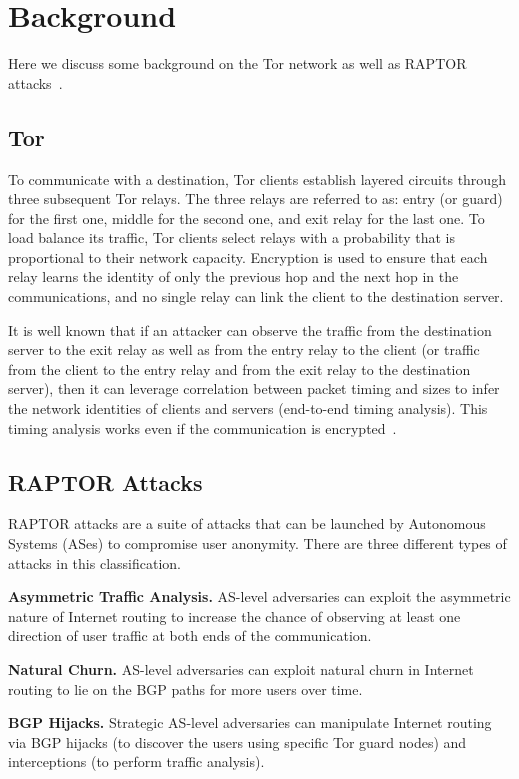 \section{Background}
Here we discuss some background on the Tor network as well as RAPTOR attacks~\cite{sun2015raptor}.

\subsection{Tor}
To communicate with a destination, Tor clients establish
layered circuits through three subsequent Tor relays. The
three relays are referred to as: entry (or guard) for the
first one, middle for the second one, and exit relay for
the last one. To load balance its traffic, Tor clients select
relays with a probability that is proportional to their
network capacity. Encryption is used to ensure that each
relay learns the identity of only the previous hop and the
next hop in the communications, and no single relay can
link the client to the destination server.

It is well known that if an attacker can observe the
traffic from the destination server to the exit relay as well
as from the entry relay to the client (or traffic from the
client to the entry relay and from the exit relay to the
destination server), then it can leverage correlation between
packet timing and sizes to infer the network identities
of clients and servers (end-to-end timing analysis).
This timing analysis works even if the communication is
encrypted~\cite{sun2015raptor}.

\subsection{RAPTOR Attacks}
RAPTOR attacks are a suite of attacks that can be launched by 
Autonomous Systems (ASes) to compromise user anonymity.  There are 
three different types of attacks in this classification.

{\bf Asymmetric Traffic Analysis.} AS-level adversaries can
exploit the asymmetric nature of Internet routing to increase
the chance of observing at least one direction of
user traffic at both ends of the communication.

{\bf Natural Churn.} AS-level adversaries can exploit natural churn in Internet
routing to lie on the BGP paths for more users over
time.

{\bf BGP Hijacks.} Strategic AS-level adversaries can manipulate Internet
routing via BGP hijacks (to discover the users using
specific Tor guard nodes) and interceptions (to perform
traffic analysis).
